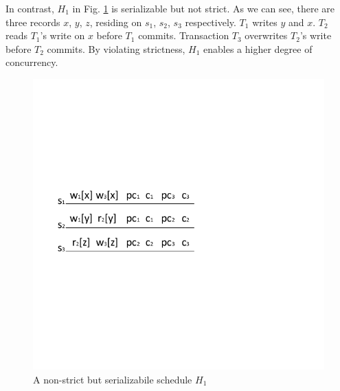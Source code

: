 \documentclass[conference]{IEEEtran}
\begin{document}
In contrast, ${H_1}$ in Fig. \ref{fig:non_strict_example} is serializable but not strict.
As we can see, there are three records ${x}$, ${y}$, ${z}$, residing on ${s_1}$, ${s_2}$, ${s_3}$ respectively.
${T_1}$ writes ${y}$ and ${x}$.
${T_2}$ reads ${T_1}$'s write on ${x}$ before ${T_1}$ commits.
Transaction ${T_3}$ overwrites ${T_2}$'s write before ${T_2}$ commits.
By violating strictness, ${H_1}$  enables a higher degree of concurrency.


\begin{figure}[tbp]
  \centerline{\includegraphics[scale=1]{schedule_non_strict.pdf}}
  \caption{A non-strict but serializabile schedule ${H_1}$}
  \label{fig:non_strict_example}
\end{figure}
\end{document}
